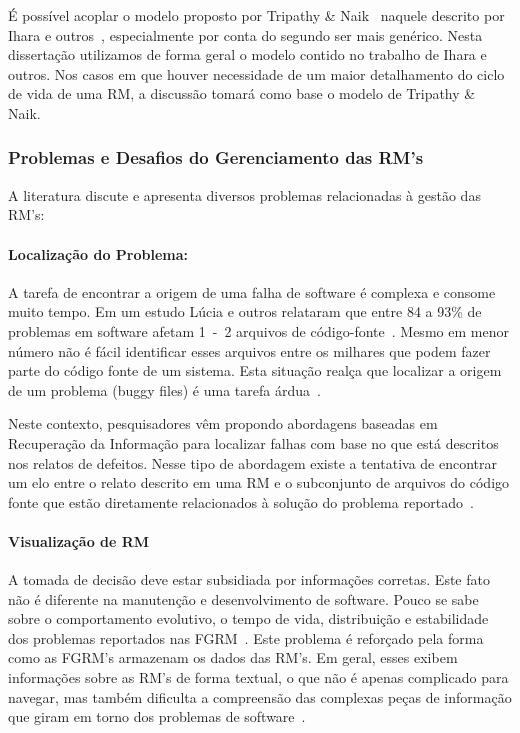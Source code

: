 É possível acoplar o modelo proposto por Tripathy \&
Naik~\cite{tripathy2014software} naquele descrito por Ihara e
outros~\cite{ihara2009analysis}, especialmente por conta do segundo ser mais
genérico.  Nesta dissertação utilizamos de forma geral o modelo contido no
trabalho de Ihara e outros. Nos casos em que houver necessidade de um maior
detalhamento do ciclo de vida de uma RM, a discussão tomará como base o modelo
de Tripathy \& Naik.
\todoend


\subsubsection{Problemas e Desafios do Gerenciamento das RM's}
\label{ssub:problemas_relacionadas_rm}

A literatura discute e apresenta diversos problemas relacionadas à gestão das
RM's:

\paragraph{Localização do Problema:} A tarefa de encontrar a origem de uma falha
de software é complexa e consome muito tempo. Em um estudo Lúcia e outros
relataram que entre 84 a 93\% de problemas em software afetam 1~-~2 arquivos de
código-fonte~\cite{thung2012faults}. Mesmo em menor número não é fácil identificar esses
arquivos entre os milhares que podem fazer parte do código fonte de um sistema. Esta situação
realça que localizar a origem de um problema (buggy files) é uma tarefa
árdua~\cite{Thung:2014:BIT:2635868.2661678}.

Neste contexto, pesquisadores vêm propondo abordagens baseadas em Recuperação da
Informação para localizar falhas com base no que está descritos nos relatos de
defeitos. Nesse tipo de abordagem existe a tentativa de encontrar um elo entre o
relato descrito em uma RM e o subconjunto de arquivos do código fonte que estão
diretamente relacionados à solução do problema
reportado~\cite{Wong:2014:BBF:2705615.2706096}.

\paragraph{Visualização de RM} A tomada de decisão deve estar subsidiada por
informações corretas. Este fato não é diferente na manutenção e desenvolvimento
de software. Pouco se sabe sobre o comportamento evolutivo, o tempo de vida,
distribuição e estabilidade dos problemas reportados nas
FGRM~\cite{hora2012bug}. Este problema é reforçado pela forma como as FGRM's
armazenam os dados das RM's. Em geral, esses exibem informações sobre as RM's de
forma textual, o que não é apenas complicado para navegar, mas também dificulta
a compreensão das complexas peças de informação que giram em torno dos problemas
de software~\cite{dal2014bug}.

